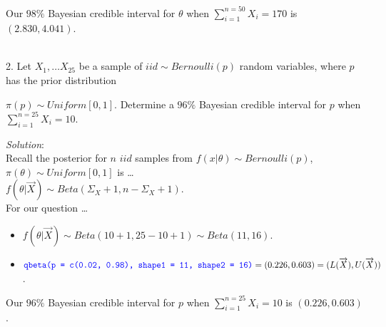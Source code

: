 \documentclass[12pt]{article}
\newcommand{\XB}{\color{black}}
\newcommand{\XBB}{\color{blue}}
\newcommand{\ds}{\displaystyle}
\begin{document}
\noindent
Our $ 98\% $ Bayesian credible interval for $ \theta $ when $ \ds \sum_{i=1}^{n=50} X_{i} = 170 $ is $ (2.830, 4.041) $. \\

\vspace{2.5mm}

\newpage
\XBB\hrulefill\XB \\

2. Let $ \ds X_{1}, \dots X_{25} $ be a sample of $ iid \sim Bernoulli(p) $ random variables,
where $ p $ has the prior distribution

$ \pi(p) \sim Uniform[0,1] $.
Determine a $ 96\% $ Bayesian credible interval for $ p $ when $ \ds \sum_{i=1}^{n=25} X_{i} = 10 $. \\

\XBB\hrulefill\XB
\vspace{5mm}

\vspace{2.5mm}
\textit{Solution}:
\vspace{2.5mm} \\

\noindent
Recall the posterior for $ n $ $ iid $ samples from $ f(x | \theta) \sim Bernoulli(p) $, $ \pi(\theta) \sim Uniform[0,1] $ is \dots \\

$ \ds f(\theta | \overrightarrow{X}) \sim Beta( \Sigma_{X} + 1, n - \Sigma_{X} + 1 ) $. \\

\noindent
For our question \dots

\begin{itemize}
    \item $ \ds f(\theta | \overrightarrow{X}) \sim Beta( 10 + 1, 25 - 10 + 1 ) \sim Beta( 11, 16 ) $.
    \item $ \ds {\XBB \texttt{qbeta(p = c(0.02, 0.98), shape1 = 11, shape2 = 16)}} = (0.226, 0.603) = (L(\overrightarrow{X}),U(\overrightarrow{X})) $.
\end{itemize}

\noindent
Our $ 96\% $ Bayesian credible interval for $ p $ when $ \ds \sum_{i=1}^{n=25} X_{i} = 10 $ is $ (0.226, 0.603) $. \\

\vspace{2.5mm}
\end{document}
